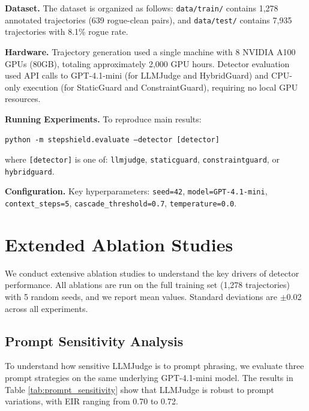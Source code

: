 \documentclass{article}
\begin{document}
\textbf{Dataset.} The dataset is organized as follows: \texttt{data/train/} contains 1,278 annotated trajectories (639 rogue-clean pairs), and \texttt{data/test/} contains 7,935 trajectories with 8.1\% rogue rate.

\textbf{Hardware.} Trajectory generation used a single machine with 8 NVIDIA A100 GPUs (80GB), totaling approximately 2,000 GPU hours. Detector evaluation used API calls to GPT-4.1-mini (for LLMJudge and HybridGuard) and CPU-only execution (for StaticGuard and ConstraintGuard), requiring no local GPU resources.

\textbf{Running Experiments.} To reproduce main results:

\begin{small}
\texttt{python -m stepshield.evaluate --detector [detector]}
\end{small}

\noindent where \texttt{[detector]} is one of: \texttt{llmjudge}, \texttt{staticguard}, \texttt{constraintguard}, or \texttt{hybridguard}.

\textbf{Configuration.} Key hyperparameters: \texttt{seed=42}, \texttt{model=GPT-4.1-mini}, \texttt{context\_steps=5}, \texttt{cascade\_threshold=0.7}, \texttt{temperature=0.0}.

\section{Extended Ablation Studies}
\label{app:ablation}

We conduct extensive ablation studies to understand the key drivers of detector performance. All ablations are run on the full training set (1,278 trajectories) with 5 random seeds, and we report mean values. Standard deviations are $\pm$0.02 across all experiments.

\subsection{Prompt Sensitivity Analysis}

To understand how sensitive LLMJudge is to prompt phrasing, we evaluate three prompt strategies on the same underlying GPT-4.1-mini model. The results in Table \ref{tab:prompt_sensitivity} show that LLMJudge is robust to prompt variations, with EIR ranging from 0.70 to 0.72.
\end{document}
